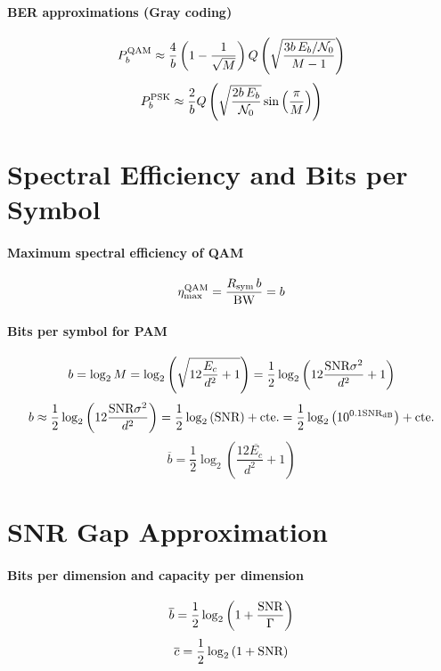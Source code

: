 \paragraph{BER approximations (Gray coding)}
\[
P_b^{\textrm{QAM}} \approx \frac{4}{b} \left(1-\frac{1}{\sqrt{M}} \right) Q\left(\sqrt{\frac{3 b \, E_b / {\cal N}_0}{M-1}} \right)
\]
\[
P_b^{\textrm{PSK}} \approx \frac{2}{b} Q\left(\sqrt{\frac{2 b \, E_b}{{\cal N}_0}} \sin \left( \frac{\pi}{M}\right) \right)
\]

\section*{Spectral Efficiency and Bits per Symbol}

\paragraph{Maximum spectral efficiency of QAM}
\begin{equation}
 \eta_{\textrm{max}}^{\textrm{QAM}} = \frac {{R_{\textrm{sym}}} \, b} {{\textrm{BW}}} =  b
 \label{eq:qam_max_efficiency}
\end{equation}

\paragraph{Bits per symbol for PAM}
\begin{equation}
b = \log_2 M = \log_2 \left( \sqrt{ 12 \frac{E_c}{d^2}+1 } \right) = \frac 1 2 \log_2 \left(  12 \frac{{\textrm{SNR}} \sigma^2}{d^2}+1  \right)
\label{eq:pambits}
\end{equation}
\[
b \approx \frac 1 2 \log_2 \left(  12 \frac{{\textrm{SNR}} \sigma^2}{d^2} \right) =
\frac 1 2 \log_2 \left(  {\textrm{SNR}} \right) + \textrm{cte.} = \frac 1 2 \log_2 \left(  10^{0.1{\textrm{SNR}_{\textrm{dB}}}} \right) + \textrm{cte.}
\]
\[
\overline b = \frac 1 2 \log_2 \left(  \frac{12 \overline{E_c} }{d^2}+1  \right)
\]

\section*{SNR Gap Approximation}

\paragraph{Bits per dimension and capacity per dimension}
\begin{equation}
\overline{b} = \frac 1 2 \log_2 \left(1 + \frac{{\textrm{SNR}}}{\Gamma} \right)
\label{eq:gap_both_pam_qam}
\end{equation}
\[
\overline{c} = \frac 1 2 \log_2 \left(1 + {\textrm{SNR}} \right)
\]

